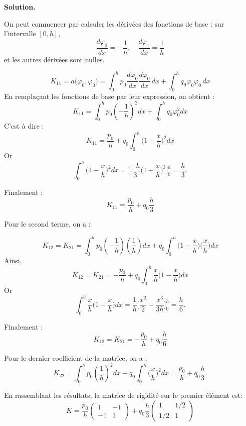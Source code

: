 \documentclass[11pt,a4paper]{report}
\newenvironment{solution}
{
    \vspace{0.5em}
    \begin{mdframed}[backgroundcolor=ThemeLight,leftmargin=0,rightmargin=0,skipabove=0.2em,skipbelow=0.2em]
    \textbf{Solution.}\\[0.5em]
}
{
    \end{mdframed}
    \vspace{0.5em}
}
\begin{document}
\begin{enumerate}[itemsep=0.5em]
{\begin{solution}
\begin{enumerate}
            On peut commencer par calculer les dérivées des fonctions de base : sur l'intervalle $[0,h]$,
            \[
            \frac{d\varphi_0}{dx} = -\frac{1}{h}, \quad \frac{d\varphi_1}{dx} = \frac{1}{h}
            \]
            et les autres dérivées sont nulles.

            \[
            K_{11} = a\big(\varphi_0, \varphi_0\big) = \int_{0}^{h} p_0 \frac{d\varphi_0}{dx} \frac{d\varphi_0}{dx} \, dx + \int_{0}^{h} q_0 \varphi_0 \varphi_0 \, dx
            \]
            En remplaçant les fonctions de base par leur expression, on obtient :
            \[
            K_{11} = \int_{0}^{h} p_0 \left( -\frac{1}{h} \right)^2 dx + \int_{0}^{h} q_0 \varphi_0^2 dx
            \]
            C'est à dire :
            \[
            K_{11} = \frac{p_0}{h} + q_0 \int_{0}^{h} \Big(1 - \frac{x}{h}\Big)^2 dx 
            \]  
            Or 
            \[\int_{0}^{h} \Big(1 - \frac{x}{h}\Big)^2 dx = \Big[\frac{-h}{3}\Big(1 - \frac{x}{h}\Big)^3\Big]_{0}^{h} = \frac{h}{3}.\]

            Finalement :
            \[
            K_{11} = \frac{p_0}{h} + q_0 \frac{h}{3}
            \]
            
            Pour le second terme, on a :

            \[
            K_{12} = K_{21} = \int_{0}^{h} p_0 \left( -\frac{1}{h} \right) \left( \frac{1}{h} \right) dx + q_0 \int_{0}^{h} \Big(1 - \frac{x}{h}\Big) \Big(\frac{x}{h}\Big) dx
            \]
            Ainsi, 
            \[
            K_{12} = K_{21} = -\frac{p_0}{h} + q_0 \int_{0}^{h} \frac{x}{h} \Big(1 - \frac{x}{h}\Big)  dx
            \]
            Or 
            \[\int_{0}^{h} \frac{x}{h}\Big(1 - \frac{x}{h}\Big)  dx = \frac{1}{h}\Big[\frac{x^2}{2} - \frac{x^3}{3h}\Big]_{0}^{h} = \frac{h}{6}.\]

            Finalement :
            \[
            K_{12} = K_{21} = -\frac{p_0}{h} + q_0 \frac{h}{6}
            \]
            
            Pour le dernier coefficient de la matrice, on a :
            \[
            K_{22} = \int_{0}^{h} p_0 \left( \frac{1}{h} \right)^2 dx  + q_0 \int_{0}^{h} \Big(\frac{x}{h}\Big)^2 dx = \frac{p_0}{h} + q_0 \frac{h}{3}.
            \]
            
            En rassemblant les résultats, la matrice de rigidité sur le premier élément est:
            \[
            K = \frac{p_0}{h}
            \begin{pmatrix}
                1 & -1 \\
                -1 & 1
            \end{pmatrix}
            + q_0 \frac{h}{3}
            \begin{pmatrix}
                1 & 1/2 \\
                1/2 & 1
            \end{pmatrix}
            \]


\end{enumerate}
\end{solution}}
\end{enumerate}
\end{document}
